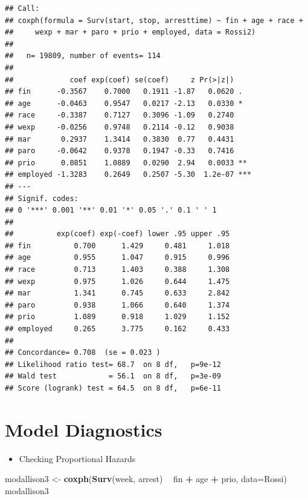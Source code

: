 \documentclass[
]{book}
\newenvironment{Shaded}{\begin{snugshade}}{\end{snugshade}}
\newcommand{\DataTypeTok}[1]{\textcolor[rgb]{0.13,0.29,0.53}{#1}}
\newcommand{\KeywordTok}[1]{\textcolor[rgb]{0.13,0.29,0.53}{\textbf{#1}}}
\newcommand{\NormalTok}[1]{#1}
\newcommand{\OperatorTok}[1]{\textcolor[rgb]{0.81,0.36,0.00}{\textbf{#1}}}
\newcommand{\StringTok}[1]{\textcolor[rgb]{0.31,0.60,0.02}{#1}}
\providecommand{\tightlist}{%
  \setlength{\itemsep}{0pt}\setlength{\parskip}{0pt}}
\begin{document}
\begin{verbatim}
## Call:
## coxph(formula = Surv(start, stop, arresttime) ~ fin + age + race + 
##     wexp + mar + paro + prio + employed, data = Rossi2)
## 
##   n= 19809, number of events= 114 
## 
##             coef exp(coef) se(coef)     z Pr(>|z|)    
## fin      -0.3567    0.7000   0.1911 -1.87   0.0620 .  
## age      -0.0463    0.9547   0.0217 -2.13   0.0330 *  
## race     -0.3387    0.7127   0.3096 -1.09   0.2740    
## wexp     -0.0256    0.9748   0.2114 -0.12   0.9038    
## mar       0.2937    1.3414   0.3830  0.77   0.4431    
## paro     -0.0642    0.9378   0.1947 -0.33   0.7416    
## prio      0.0851    1.0889   0.0290  2.94   0.0033 ** 
## employed -1.3283    0.2649   0.2507 -5.30  1.2e-07 ***
## ---
## Signif. codes:  
## 0 '***' 0.001 '**' 0.01 '*' 0.05 '.' 0.1 ' ' 1
## 
##          exp(coef) exp(-coef) lower .95 upper .95
## fin          0.700      1.429     0.481     1.018
## age          0.955      1.047     0.915     0.996
## race         0.713      1.403     0.388     1.308
## wexp         0.975      1.026     0.644     1.475
## mar          1.341      0.745     0.633     2.842
## paro         0.938      1.066     0.640     1.374
## prio         1.089      0.918     1.029     1.152
## employed     0.265      3.775     0.162     0.433
## 
## Concordance= 0.708  (se = 0.023 )
## Likelihood ratio test= 68.7  on 8 df,   p=9e-12
## Wald test            = 56.1  on 8 df,   p=3e-09
## Score (logrank) test = 64.5  on 8 df,   p=6e-11
\end{verbatim}

\hypertarget{model-diagnostics}{%
\section{Model Diagnostics}\label{model-diagnostics}}

\begin{itemize}
\tightlist
\item
  Checking Proportional Hazards
\end{itemize}

\begin{Shaded}
\begin{Highlighting}[]
\NormalTok{modallison3 <-}\StringTok{ }\KeywordTok{coxph}\NormalTok{(}\KeywordTok{Surv}\NormalTok{(week, arrest) }\OperatorTok{~}\StringTok{ }\NormalTok{fin }\OperatorTok{+}\StringTok{ }\NormalTok{age }\OperatorTok{+}\StringTok{ }\NormalTok{prio, }\DataTypeTok{data=}\NormalTok{Rossi)}
\NormalTok{modallison3}
\end{Highlighting}
\end{Shaded}
\end{document}
